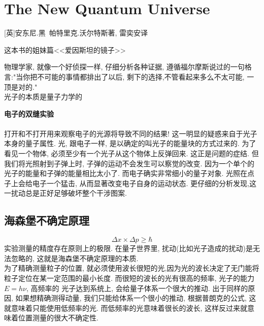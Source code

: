 \documentclass[openany]{book}
\begin{document}
\chapter{The New Quantum Universe}
[英]安东尼.黑\ 帕特里克.沃尔特斯著, 雷奕安译

这本书的姐妹篇<<爱因斯坦的镜子>>

物理学家, 就像一个好侦探一样, 仔细分析各种证据, 遵循福尔摩斯说过的一句格言:"当你把不可能的事情都排出了以后, 剩下的选择,不管看起来多么不太可能, 一顶是对的."  \\
光子的本质是量子力学的

\textbf{电子的双缝实验}\\
\\
打开和不打开用来观察电子的光源将导致不同的结果! 这一明显的疑惑来自于光子本身的量子属性. 光, 跟电子一样, 是以确定的叫光子的能量块的方式过来的. 为了看见一个物体, 必须至少有一个光子从这个物体上反弹回来. 这正是问题的症结. 但我们将光照射到子弹上时, 子弹的运动不会发生可以察觉的改变. 因为一个单个的光子的能量和子弹的能量相比太小了. 而电子确实非常细小的量子对象. 光照在点子上会给电子一个猛击, 从而显著改变电子自身的运动状态. 更仔细的分析发现,这一扰动总是正好足够破坏整个干涉图案.
\bigskip

\section{海森堡不确定原理}
$$
\Delta x\times \Delta p \geq \hbar
$$
实验测量的精度存在原则上的极限. 在量子世界里, 扰动(比如光子造成的扰动)是无法忽略的, 这就是海森堡不确定原理的本质.\\
为了精确测量粒子的位置, 就必须使用波长很短的光,因为光的波长决定了无门能将粒子定位在某一定范围的最小长度. 而很短的波长的光有很高的频率, 光子的能力$E=h\nu$, 高频率的
光子达到系统上, 会给量子体系一个很大的推动. 出于同样的原因, 如果想精确测得动量, 我们只能给体系一个很小的推动, 根据普朗克的公式, 这就意味着只能使用低频率的光. 而低频率的光意味着很长的波长, 这样反过来就意味着位置测量的很大不确定性.
\bigskip
\end{document}

